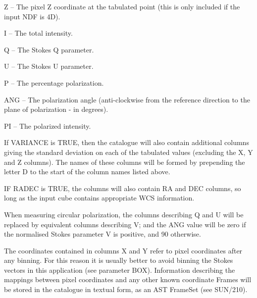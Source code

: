 \documentclass[twoside,11pt]{article}
\renewcommand{\_}{\texttt{\symbol{95}}}
\newcommand{\sstitem}{\item}
\newcommand{\sstitem}{\item}
\begin{document}
{{{{            \sstitem
               Z  -- The pixel Z coordinate at the tabulated point (this
                       is only included if the input NDF is 4D).

            \sstitem
               I  -- The total intensity.

            \sstitem
               Q  -- The Stokes Q parameter.

            \sstitem
               U  -- The Stokes U parameter.

            \sstitem
               P  -- The percentage polarization.

            \sstitem
               ANG  -- The polarization angle (anti-clockwise from the
               reference direction to the plane of polarization - in degrees).

            \sstitem
               PI -- The polarized intensity.

         }
         If VARIANCE is TRUE, then the catalogue will also contain
         additional columns giving the standard deviation on each of the
         tabulated values (excluding the X, Y and Z columns). The names of
         these columns will be formed by prepending the letter D to the
         start of the column names listed above.

         IF RADEC is TRUE, the columns will also contain RA and DEC
         columns, so long as the input cube contains appropriate WCS
         information.

         When measuring circular polarization, the columns describing Q
         and U will be replaced by equivalent columns describing V; and
         the ANG value will be zero if the normalised Stokes parameter V
         is positive, and 90 otherwise.

         The coordinates contained in columns X and Y refer to pixel
         coordinates after any binning. For this reason it is usually better
         to avoid binning the Stokes vectors in this application (see
         parameter BOX). Information describing the mappings between pixel
         coordinates and any other known coordinate Frames will be stored in
         the catalogue in textual form, as an AST FrameSet (see SUN/210).

}}}
\end{document}
